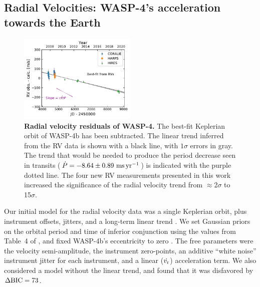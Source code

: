 \documentclass[12pt,twocolumn,tighten]{aastex62}
\begin{document}
\subsection{Radial Velocities: WASP-4's acceleration towards the Earth}

\begin{figure}[t]
	\begin{center}
		\leavevmode
		\includegraphics[width=0.5\textwidth]{f2.pdf}
	\end{center}
	\vspace{-0.7cm}
	\caption{
    {\bf Radial velocity residuals of WASP-4.} The best-fit
    Keplerian orbit of WASP-4b has been subtracted.  The linear trend
    inferred from the RV data is shown with a black line, with
    $1\sigma$ errors in gray.  The trend that would be needed to
    produce the period decrease seen in transits ($\dot{P}= - 8.64 \pm
    0.89~{\rm ms}\,{\rm yr}^{-1}$) is indicated with the purple dotted
    line.  The four new RV measurements presented in this work
    increased the significance of the radial velocity trend from
    $\approx$2$\sigma$ to 15$\sigma$.
	\label{fig:rvs}
  \vspace{-0.3cm}
	}
\end{figure}

Our initial model for the radial velocity data was a single Keplerian
orbit, plus instrument offsets, jitters, and a long-term linear trend
\citep[][\texttt{radvel}]{fulton_radvel_2018}.  We set Gaussian priors
on the orbital period and time of inferior conjunction using the
values from Table~4 of , and fixed
WASP-4b's eccentricity to zero
\citep{beerer_secondary_2011,knutson_friends_2014,bonomo_gaps_2017}.
The free parameters were the velocity semi-amplitude, the instrument
zero-points, an additive ``white noise'' instrument jitter for each
instrument, and a linear ($\dot{v_{\rm r}}$) acceleration term.  We
also considered a model without the linear trend, and found that it
was disfavored by $\Delta {\rm BIC}=73$.
\end{document}

